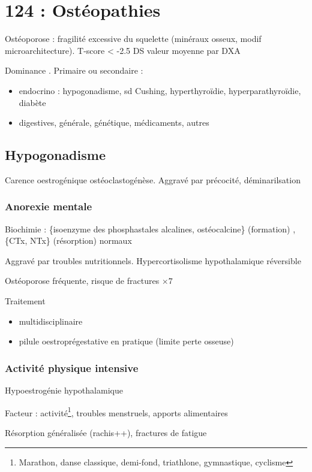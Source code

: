 \documentclass[11pt]{article}
\begin{document}
\section{124 : Ostéopathies}
\label{sec:org4507247}
Ostéoporose : fragilité excessive du squelette (\dec minéraux osseux, modif
microarchitecture). T-score < -2.5 DS valeur moyenne par DXA

Dominance \female. Primaire ou secondaire :
\begin{itemize}
\item endocrino : hypogonadisme, sd Cushing, hyperthyroïdie, hyperparathyroïdie, diabète
\item digestives, générale, génétique, médicaments, autres
\end{itemize}

\subsection{Hypogonadisme}
\label{sec:org40c98a7}
Carence oestrogénique \inc ostéoclastogénèse. Aggravé par précocité,
déminarilsation
\subsubsection{Anorexie mentale}
\label{sec:orga2ae939}
Biochimie : \{isoenzyme des phosphastales alcalines, ostéocalcine\} (formation)
\dec, \{CTx, NTx\} (résorption) normaux

Aggravé par troubles nutritionnels. Hypercortisolisme hypothalamique réversible

Ostéoporose fréquente, risque de fractures \(\times 7\)

Traitement 
\begin{itemize}
\item multidisciplinaire
\item pilule oestroprégestative en pratique (limite perte osseuse)
\end{itemize}

\subsubsection{Activité physique intensive}
\label{sec:org5e973f5}
Hypoestrogénie hypothalamique

Facteur : activité\footnote{Marathon, danse classique, demi-fond, triathlone, gymnastique, cyclisme}, troubles menstruels, apports alimentaires

Résorption généralisée (rachis++), \inc fractures de fatigue
\end{document}
